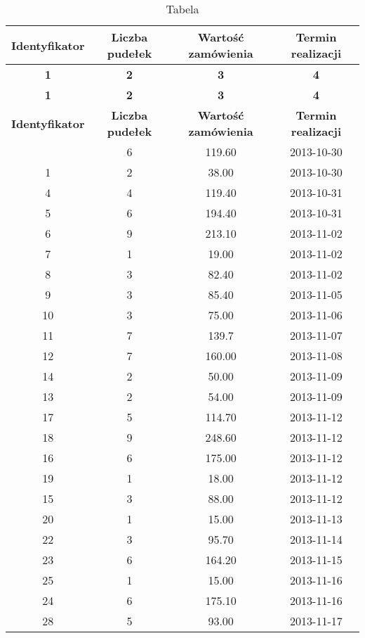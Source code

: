 \documentclass[a4paper,10pt]{report}
\begin{document}
	
	\begin{longtable}{|c|c|c|c|}
		\caption{Tabela}\\
		\hline	
		\textbf{Identyfikator} & \textbf{Liczba pudełek} & \textbf{Wartość zamówienia} & \textbf{Termin realizacji} \\ \hline
		\textbf{1} & \textbf{2} & \textbf{3} & \textbf{4} \\ \hline
		\endfirsthead
		\hline
		\textbf{1} & \textbf{2} & \textbf{3} & \textbf{4} \\
		\hline
		\endhead
		\endfoot
		\textbf{Identyfikator} & \textbf{Liczba pudełek} & \textbf{Wartość zamówienia} & \textbf{Termin realizacji} \\
		\hline
		\endlastfoot
3 &  6&  119.60& 2013-10-30 \\ \hline
1 & 2 &  38.00 &2013-10-30 \\ \hline
4 & 4 & 119.40 &2013-10-31 \\ \hline
5 & 6 & 194.40 &2013-10-31 \\ \hline
6 & 9 & 213.10 &2013-11-02 \\ \hline
7 & 1 &  19.00 &2013-11-02 \\ \hline
8 & 3 &  82.40 &2013-11-02 \\ \hline
9 & 3 &  85.40 &2013-11-05 \\ \hline
10 &  3 &  75.00 & 2013-11-06 \\ \hline
11 &  7 & 139.7  & 2013-11-07 \\ \hline
12 &  7 & 160.00 & 2013-11-08\\ \hline
14 &  2 &  50.00 & 2013-11-09\\ \hline
13 &  2 &  54.00 & 2013-11-09\\ \hline
17 &  5 & 114.70 & 2013-11-12\\ \hline
18 &  9 & 248.60 & 2013-11-12\\ \hline
16 &  6 & 175.00 & 2013-11-12\\ \hline
19 &  1 &  18.00 & 2013-11-12\\ \hline
15 &  3 &  88.00 & 2013-11-12\\ \hline
20 &  1 &  15.00 & 2013-11-13\\ \hline
22 &  3 &  95.70 & 2013-11-14\\ \hline
23 &  6 & 164.20 & 2013-11-15\\ \hline
25 &  1 &  15.00 & 2013-11-16\\ \hline
24 &  6 & 175.10 & 2013-11-16\\ \hline
28 &  5 &  93.00 & 2013-11-17\\ \hline

\end{longtable}
\end{document}
